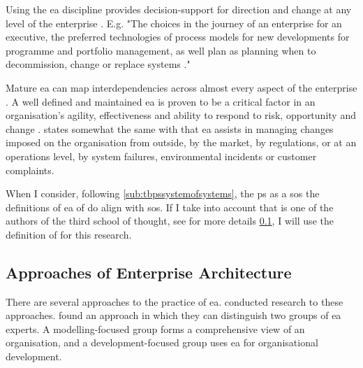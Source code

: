 Using the \acrshort{ea} discipline provides decision-support for direction and change at any level of the enterprise \parencite[p.~4]{Graves2009}. E.g. "The choices in the journey of an enterprise for an executive, the preferred technologies of process models for new developments for programme and portfolio management, as well plan as planning when to decommission, change or replace systems \parencite[p.~4]{Graves2009}."

Mature \acrshort{ea} can map interdependencies across almost every aspect of the enterprise \parencite[p.~5]{Graves2009}. A well defined and maintained \acrshort{ea} is proven to be a critical factor in an organisation's agility, effectiveness and ability to respond to risk, opportunity and change \parencite{Ross2014}. \textcite[p.~5]{Graves2009} states somewhat the same with that \acrshort{ea} assists in managing changes imposed on the organisation from outside, by the market, by regulations, or at an operations level, by system failures, environmental incidents or customer complaints.

When I consider, following \cref{sub:tbpssystemofsystems}, the \gls{ps} as a \acrfull{sos} the definitions of \acrshort{ea} of \textcites{Gartner}{Graves2009} do align with \acrshort{sos}. If I take into account that \textcite{Graves2009} is one of the authors of the third school of thought, see for more details \cref{sub:eaapproaches}, I will use the definition of \citeauthor{Graves2009} for this research.

\subsection{Approaches of Enterprise Architecture}
\label{sub:eaapproaches}
There are several approaches to the practice of \acrshort{ea}. \textcites{Lapalme2012}{Kotusev2015}{Ylinen2018}{Ylinen2020} conducted research to these approaches. \textcites{Ylinen2018}{Ylinen2020} found an approach in which they can distinguish two groups of \acrshort{ea} experts. A modelling-focused group forms a comprehensive view of an organisation, and a development-focused group uses \acrshort{ea} for organisational development. 


